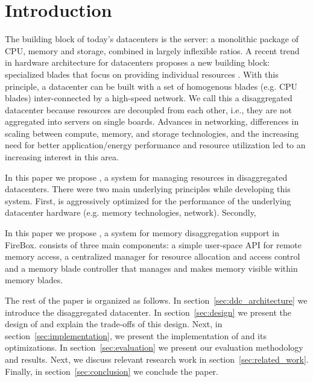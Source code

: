 \section{Introduction}
\label{sec:introduction}

The building block of today’s datacenters is the server: a monolithic package of CPU, memory and storage, combined in largely inflexible ratios. A recent trend in hardware architecture for datacenters proposes a new building block: specialized blades that focus on providing individual resources \cite{hp_the_machine, huawei_dc_30, hp_moonshot, fb_disag_rack, intel_rsa, ericsson, fujitsu_disag}. With this principle, a datacenter can be built with a set of homogenous blades (e.g. CPU blades) inter-connected by a high-speed network. We call this a disaggregated datacenter because resources are decoupled from each other, i.e., they are not aggregated into servers on single boards. Advances in networking, differences in scaling between compute, memory, and storage technologies, and the increasing need for better application/energy performance and resource utilization led to an increasing interest in this area. 

In this paper we propose \System, a system for managing resources in disaggregated datacenters. There were two main underlying principles while developing this system. First, \System is aggressively optimized for the performance of the underlying datacenter hardware (e.g. memory technologies, network). Secondly, 


In this paper we propose \System,
a system for memory disaggregation support in FireBox. \System consists of three main components: a simple user-space API for remote memory access, a centralized manager for resource allocation and access control and a memory blade controller that manages and makes memory visible within memory blades. 

The rest of the paper is organized as follows. In section~\ref{sec:ddc_architecture} we introduce the disaggregated datacenter. In section~\ref{sec:design} we present the design of \System and explain the trade-offs of this design. Next, in section~\ref{sec:implementation}, we present the implementation of \System and its optimizations. In section~\ref{sec:evaluation} we present our evaluation methodology and results. Next, we discuss relevant research work in section~\ref{sec:related_work}. Finally, in section~\ref{sec:conclusion} we conclude the paper.

